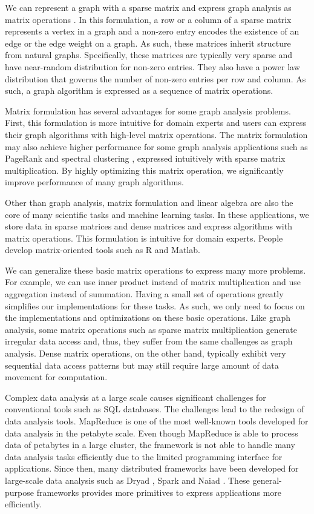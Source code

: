 We can represent a graph with a sparse matrix and express graph analysis
as matrix operations \cite{Mattson13}. In this formulation, a row
or a column of a sparse matrix represents a vertex in a graph and a non-zero
entry encodes the existence of an edge or the edge weight on a graph.
As such, these matrices inherit structure from natural graphs. Specifically,
these matrices are typically very sparse and have near-random distribution
for non-zero entries. They also have a power law distribution that governs
the number of non-zero entries per row and column. As such, a graph algorithm
is expressed as a sequence of matrix operations.

Matrix formulation has several advantages for some graph analysis problems.
First, this formulation is more intuitive for domain experts and users can
express their graph algorithms with high-level matrix operations. The matrix
formulation may also achieve higher performance for some graph analysis
applications such as PageRank \cite{pagerank} and spectral clustering
\cite{spectral}, expressed intuitively with sparse matrix multiplication.
By highly optimizing this matrix operation,
we significantly improve performance of many graph algorithms.

Other than graph analysis, matrix formulation and linear algebra are also
the core of many scientific tasks and machine learning tasks. In these
applications, we store data in sparse matrices and dense matrices and express
algorithms with matrix operations. This formulation is intuitive for domain
experts.
People develop matrix-oriented tools such
as R and Matlab.

We can generalize these basic matrix operations
to express many more problems. For example, we can use inner product instead of
matrix multiplication and use aggregation instead of summation. Having a small
set of operations greatly simplifies our implementations for these tasks.
As such, we only need to focus on the implementations and optimizations
on these basic operations. Like graph analysis, some matrix operations
such as sparse matrix multiplication generate irregular data access and, thus,
they suffer from the same challenges as graph analysis. Dense matrix operations,
on the other hand, typically exhibit very sequential data access patterns but
may still require large amount of data movement for computation.

Complex data analysis at a large scale causes significant challenges for
conventional tools such as SQL databases. The challenges lead to the redesign
of data analysis tools. MapReduce
\cite{mapreduce} is one of the most well-known tools developed for data
analysis in the petabyte scale. Even though MapReduce is able to
process data of petabytes in a large cluster, the framework is not able to
handle many data analysis tasks efficiently due to the limited programming
interface for applications. Since then, many distributed frameworks have
been developed for large-scale data analysis such as Dryad \cite{dryad},
Spark \cite{spark} and Naiad \cite{naiad}. These general-purpose frameworks
provides more primitives to express applications more efficiently.

